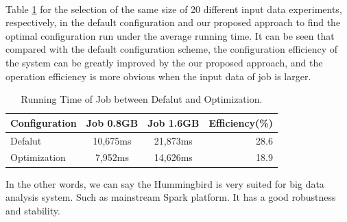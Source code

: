     ~ %
    ~ %

\par Table \ref{tab:runningtimecompare} for the selection of the same size of 20 different input data experiments, respectively, in the default configuration and our proposed approach to find the optimal configuration run under the average running time. It can be seen that compared with the default configuration scheme, the configuration efficiency of the system can be greatly improved by the our proposed approach, and the operation efficiency is more obvious when the input data of job is larger. 
\begin{table}[htbp!]
\centering
\caption{Running Time of Job between Defalut and Optimization.} \label{tab:runningtimecompare} 
\begin{center}
    \begin{tabular}{l*{2}{c}r}
    \hline
    Configuration & Job 0.8GB & Job 1.6GB & Efficiency(\%) \\
    \hline
    Defalut & 10,675ms & 21,873ms & 28.6 \\
    Optimization & 7,952ms & 14,626ms & 18.9  \\
    \hline
    \end{tabular}
\end{center}
\end{table}

\par   In the other words, we can say the Hummingbird is very suited for big data analysis system. Such as mainstream Spark platform. It has a good robustness and stability.
